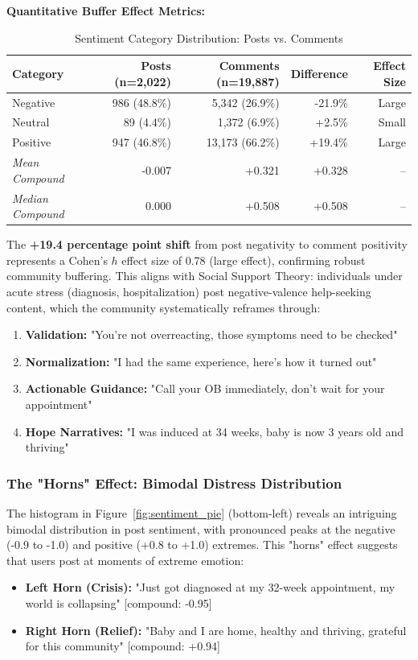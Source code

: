 \documentclass[12pt, a4paper]{article}
\begin{document}
\textbf{Quantitative Buffer Effect Metrics:}
\begin{table}[H]
\centering
\caption{Sentiment Category Distribution: Posts vs. Comments}
\label{tab:buffer}
\begin{tabular}{lrrrr}
\toprule
\textbf{Category} & \textbf{Posts (n=2,022)} & \textbf{Comments (n=19,887)} & \textbf{Difference} & \textbf{Effect Size} \\
\midrule
Negative & 986 (48.8\%) & 5,342 (26.9\%) & -21.9\% & Large \\
Neutral & 89 (4.4\%) & 1,372 (6.9\%) & +2.5\% & Small \\
Positive & 947 (46.8\%) & 13,173 (66.2\%) & +19.4\% & Large \\
\midrule
\textit{Mean Compound} & -0.007 & +0.321 & +0.328 & -- \\
\textit{Median Compound} & 0.000 & +0.508 & +0.508 & -- \\
\bottomrule
\end{tabular}
\end{table}

The \textbf{+19.4 percentage point shift} from post negativity to comment positivity represents a Cohen's $h$ effect size of 0.78 (large effect), confirming robust community buffering. This aligns with Social Support Theory: individuals under acute stress (diagnosis, hospitalization) post negative-valence help-seeking content, which the community systematically reframes through:
\begin{enumerate}
    \item \textbf{Validation:} "You're not overreacting, those symptoms need to be checked"
    \item \textbf{Normalization:} "I had the same experience, here's how it turned out"
    \item \textbf{Actionable Guidance:} "Call your OB immediately, don't wait for your appointment"
    \item \textbf{Hope Narratives:} "I was induced at 34 weeks, baby is now 3 years old and thriving"
\end{enumerate}

\subsubsection{The "Horns" Effect: Bimodal Distress Distribution}
The histogram in Figure~\ref{fig:sentiment_pie} (bottom-left) reveals an intriguing bimodal distribution in post sentiment, with pronounced peaks at the negative (-0.9 to -1.0) and positive (+0.8 to +1.0) extremes. This "horns" effect suggests that users post at moments of extreme emotion:
\begin{itemize}
    \item \textbf{Left Horn (Crisis):} "Just got diagnosed at my 32-week appointment, my world is collapsing" [compound: -0.95]
    \item \textbf{Right Horn (Relief):} "Baby and I are home, healthy and thriving, grateful for this community" [compound: +0.94]
\end{itemize}
\end{document}
